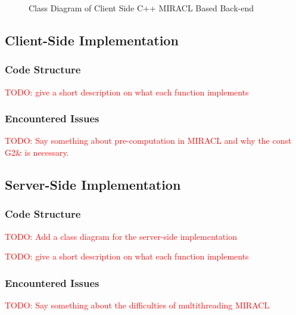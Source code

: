 \begin{figure}
{{
    }}
    \caption{Class Diagram of Client Side C++ MIRACL Based Back-end}
    \label{fig:class_client_side}
\end{figure}
\subsection{Client-Side Implementation}
\subsubsection{Code Structure}
\textcolor{red}{TODO: give a short description on what each function implements}

\subsubsection{Encountered Issues}
\textcolor{red}{TODO: Say something about pre-computation in MIRACL and why the const G2\& is necessary.}

\subsection{Server-Side Implementation}

\subsubsection{Code Structure}
\textcolor{red}{TODO: Add a class diagram for the server-side implementation}

\textcolor{red}{TODO: give a short description on what each function implements}

\subsubsection{Encountered Issues}
\textcolor{red}{TODO: Say something about the difficulties of multithreading MIRACL}

